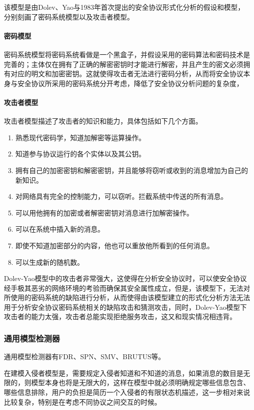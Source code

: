 \documentclass[cs4size,a4pape,UTF8]{ctexart}
\numberwithin{equation}{section}
\numberwithin{table}{section}
\numberwithin{figure}{section}
\begin{document}
该模型是由Dolev、Yao与1983年首次提出的安全协议形式化分析的假设和模型，分别刻画了密码系统模型以及攻击者模型。

\paragraph{密码模型}
密码系统模型将密码系统看做是一个黑盒子，并假设采用的密码算法和密码技术是完善的；主体仅在拥有了正确的解密密钥时才能进行解密，并且产生的密文必须拥有对应的明文和加密密钥。这就使得攻击者无法进行密码分析，从而将安全协议本身与安全协议所采用的密码系统分开考虑，降低了安全协议分析问题的复杂度，

\paragraph{攻击者模型}
攻击者模型描述了攻击者的知识和能力，具体包括如下几个方面。

\begin{enumerate}[(1)]
\item 熟悉现代密码学，知道加解密等运算操作。
\item 知道参与协议运行的各个实体以及其公钥。
\item 拥有自己的加密密钥和解密密钥，并且能够将窃听或收到的消息增加为自己的新知识。
\item 对网络具有完全的控制能力，可以窃听。拦截系统中传送的所有消息。
\item 可以用他拥有的加密或者解密密钥对消息进行加解密操作。
\item 可以在系统中插入新的消息。
\item 即使不知道加密部分的内容，他也可以重放他所看到的任何消息。
\item 可以生成新的随机数。
\end{enumerate}

Dolev-Yao模型中的攻击者非常强大，这使得在分析安全协议时，可以使安全协议经手极其恶劣的网络环境的考验而确保其安全属性成立，但是，该模型下，无法对所使用的密码系统的缺陷进行分析，从而使得由该模型建立的形式化分析方法无法用于分析安全协议密码系统相关的缺陷攻击和猜测攻击，同时，Dolev-Yao模型下攻击者的能力太强，攻击者总能实现拒绝服务攻击，这又和现实情况相违背。

\subsubsection{通用模型检测器}
通用模型检测器有FDR、SPN、SMV、BRUTUS等。

在建模入侵者模型是，需要规定入侵者知道和不知道的消息，如果消息的数目是无限的，则模型本身也将是无限大的，这样在模型中就必须明确规定哪些信息包含、哪些信息排除，用户的负担是简历一个入侵者的有限状态机描述，这一步相对来说比较复杂，特别是在考虑不同协议之间交互的时候\cite{3}。
\end{document}

